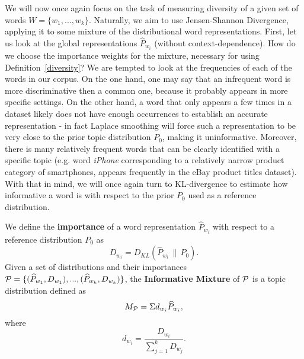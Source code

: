 We will now once again
focus on the task of measuring diversity of a given set of words
$W=\{w_1,...,w_k\}$. Naturally, we aim to use Jensen-Shannon
Divergence, applying it to some mixture of the distributional word
representations. First, let us look at the global representations
$\widehat{P}_{w_i}$ (without context-dependence). How do we choose the
importance weights for the mixture, necessary for using
Definition~\ref{diversity}? 
We 
are tempted to look at the frequencies of each of the words in our
corpus. On the one hand, one may say that an infrequent word is more
discriminative then a common one, because it probably appears in more
specific settings. On the other hand, a word that only appears a few
times in a dataset likely does not have enough occurrences to establish an
accurate representation - in fact Laplace smoothing will force such a
representation to be very close to the prior topic distribution
$P_0$, making it uninformative. Moreover, there is many relatively frequent words
that can be clearly identified with a specific topic (e.g. word
{\em iPhone} corresponding to a relatively narrow product category of smartphones,
appears frequently in the eBay product titles dataset). With
that in mind, we will once again turn to KL-divergence to
estimate how informative a word is with respect to the prior $P_0$
used as a reference distribution.

\bed\label{mixture}
We define the {\bf importance} of a word representation $\widehat{P}_{w_i}$ with
respect to a reference distribution $P_0$ as 
\[D_{w_i}=D_{KL}(\widehat{P}_{w_i}\,\|\,P_0).\]
Given a set of distributions and their importances ${\mathcal P} =
\{(\widehat{P}_{w_1},D_{w_1}),...,(\widehat{P}_{w_k},D_{w_k})\}$, the
{\bf Informative Mixture} of ${\mathcal P}$ is a topic distribution defined as 
\[M_{{\mathcal P}} = \Sigma d_{w_i} \widehat{P}_{w_i},\]
where
\[d_{w_i} = \frac{D_{w_i}}{\sum_{j=1}^k D_{w_j}}.\]
\eed

